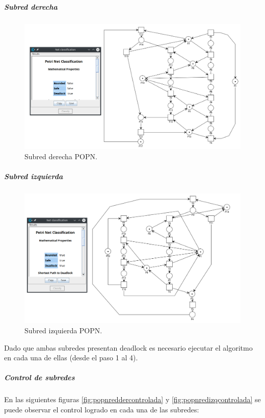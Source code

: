 \subparagraph{Subred derecha}
\hfill
\begin{figure}[H]
	\centering
	\includegraphics[scale=0.48]{Figures/algoritmo3/POP2.png}
	\caption{Subred derecha POPN.}
	\label{fig:popnredder}
 \end{figure}

\subparagraph{Subred izquierda}
\hfill
\begin{figure}[H]
	\centering
	\includegraphics[scale=0.5]{Figures/algoritmo3/POP3.png}
	\caption{Subred izquierda POPN.}
	\label{fig:popnredizq}
 \end{figure}
\bigskip

Dado que ambas subredes presentan deadlock es necesario ejecutar el algoritmo en cada una de ellas (desde el paso 1 al 4). 
\bigskip

\newpage
\subparagraph{Control de subredes}
\hfill \break
En las siguientes figuras \ref{fig:popnreddercontrolada} y \ref{fig:popnredizqcontrolada} se puede observar el control logrado en cada una de las subredes:\\ 
\bigskip

